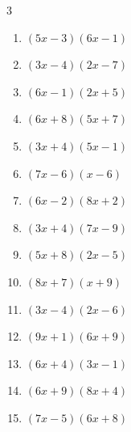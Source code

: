 \begin{multicols}{3}
\begin{enumerate}
  \item $(5x-3)(6x-1)$


\columnbreak %

  \item $(3x-4)(2x-7)$


  \item $(6x-1)(2x+5)$


  \item $(6x+8)(5x+7)$


  \item $(3x+4)(5x-1)$


  \item $(7x-6)(x-6)$


  \item $(6x-2)(8x+2)$


  \item $(3x+4)(7x-9)$


  \item $(5x+8)(2x-5)$


  \item $(8x+7)(x+9)$


  \item $(3x-4)(2x-6)$


  \item $(9x+1)(6x+9)$


  \item $(6x+4)(3x-1)$


  \item $(6x+9)(8x+4)$


  \item $(7x-5)(6x+8)$


\end{enumerate}
\end{multicols}
